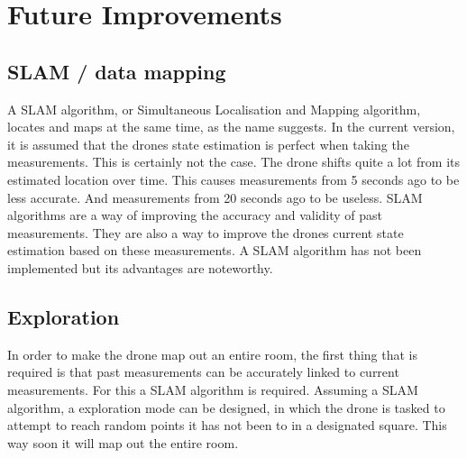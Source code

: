 \documentclass{article}
\begin{document}
\section{Future Improvements}
\subsection{SLAM / data mapping}
\label{sec:SLAM}
A SLAM algorithm, or Simultaneous Localisation and Mapping algorithm, locates and maps at the same time, as the name suggests. In the current version, it is assumed that the drones state estimation is perfect when taking the measurements. This is certainly not the case. The drone shifts quite a lot from its estimated location over time. This causes measurements from 5 seconds ago to be less accurate. And measurements from 20 seconds ago to be useless. SLAM algorithms are a way of improving the accuracy and validity of past measurements. They are also a way to improve the drones current state estimation based on these measurements.
A SLAM algorithm has not been implemented but its advantages are noteworthy.

\subsection{Exploration}
In order to make the drone map out an entire room, the first thing that is required is that past measurements can be accurately linked to current measurements. For this a SLAM algorithm is required. Assuming a SLAM algorithm, a exploration mode can be designed, in which the drone is tasked to attempt to reach random points it has not been to in a designated square. This way soon it will map out the entire room.






\end{document}
